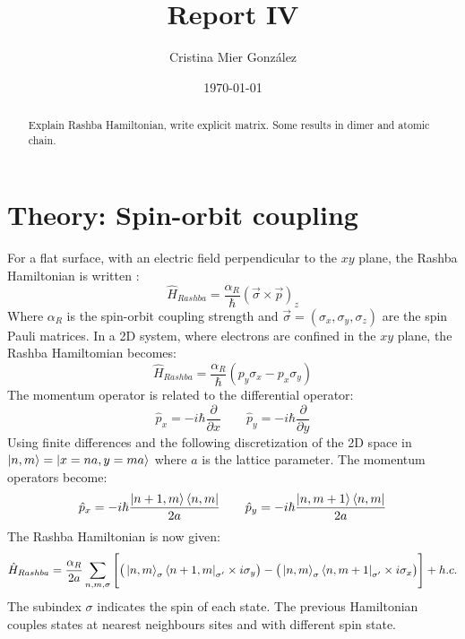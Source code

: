 \documentclass[letterpaper,12pt]{article}
\begin{document}
\title{Report IV}
\author{Cristina Mier Gonz\'alez}
\date{\today}
\maketitle

\begin{abstract}
Explain Rashba Hamiltonian, write explicit matrix. Some results in dimer and atomic chain.
\end{abstract}

\section{Theory: Spin-orbit coupling}
For a flat surface, with an electric field perpendicular to the $xy$ plane, the Rashba Hamiltonian is written \cite{Manchon2015}:
\begin{equation}
    \hat{H}_{Rashba} = \frac{\alpha_R}{\hbar}(\Vec{\sigma}\times\Vec{p})_z
\end{equation}
Where $\alpha_R$ is the spin-orbit coupling strength and $\Vec{\sigma} = (\sigma_x, \sigma_y, \sigma_z)$ are the spin Pauli matrices. In a 2D system, where electrons are confined in the $xy$ plane, the Rashba Hamiltomian becomes:
\begin{equation}
    \hat{H}_{Rashba} = \frac{\alpha_R}{\hbar}(p_y\sigma_x - p_x\sigma_y)
    \label{2D}
\end{equation}
The momentum operator is related to the differential operator:
\begin{equation}
    \hat{p}_x = -i\hbar\frac{\partial}{\partial x} \qquad \hat{p}_y = -i\hbar\frac{\partial}{\partial y}
\end{equation}
Using finite differences and the following discretization of the 2D space in $\ket{n, m} = \ket{x = na, y = ma}$ where $a$ is the lattice parameter. The momentum operators become:
\begin{equation}
    \hat{p}_x = -i\hbar \frac{\ket{n+1, m}\bra{n, m}}{2a} \qquad  \hat{p}_y = -i\hbar \frac{\ket{n, m+1}\bra{n, m}}{2a}
\end{equation}
The Rashba Hamiltonian is now given:
\begin{equation}
    \hat{H}_{Rashba} = \frac{\alpha_R}{2a}\sum_{n, m, \sigma}\Bigg[ \big(\ket{n, m}_\sigma\bra{n+1, m}_{\sigma'}\times i\sigma_y\big) - \big(\ket{n, m}_{\sigma}\bra{n, m + 1}_{\sigma'}\times i\sigma_x \big)\Bigg] + h.c.
     \label{tight}
\end{equation}
The subindex $\sigma$ indicates the spin of each state. The previous Hamiltonian couples states at nearest neighbours sites and with different spin state. \\ \\
\end{document}
